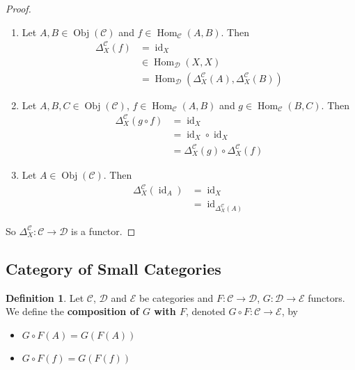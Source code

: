 \documentclass{book}
\theoremstyle{definition}
\newtheorem{defn}[definition]{Definition}
\newcommand{\Del}{\Delta}
\newcommand{\MC}{\mathcal{C}}
\newcommand{\MD}{\mathcal{D}}
\newcommand{\ME}{\mathcal{E}}
\newcommand{\ld}[1]{\label{defn:#1}}
\DeclareMathOperator{\id}{id}
\DeclareMathOperator{\Obj}{Obj}
\DeclareMathOperator{\Hom}{Hom}
\DeclareMathOperator*{\0}{\mbf{0}}
\DeclareMathOperator*{\1}{\mbf{1}}
\begin{document}
	\begin{proof}\
		\begin{enumerate}
			\item Let $A, B \in \Obj(\MC)$ and $f \in \Hom_{\MC}(A, B)$. Then 
			\begin{align*}
				\Del^{\MC}_X (f)
				& = \id_X \\
				& \in \Hom_{\MD}(X, X) \\
				& = \Hom_{\MD}(\Del^{\MC}_X (A), \Del^{\MC}_X (B))
			\end{align*}  
			\item Let $A,B,C \in \Obj(\MC)$, $f \in \Hom_{\MC}(A, B)$ and $g \in \Hom_{\MC}(B, C)$. Then 
			\begin{align*}
				\Del^{\MC}_X (g \circ f) 
				& = \id_X \\
				& = \id_X \circ \id_X \\
				& = \Del^{\MC}_X (g) \circ \Del^{\MC}_X (f)
			\end{align*} 
			\item Let $A \in \Obj(\MC)$. Then 
			\begin{align*}
				\Del^{\MC}_X (\id_A)
				& = \id_X \\
				& = \id_{\Del^{\MC}_X (A)}
			\end{align*}
		\end{enumerate}
		So $\Del^{\MC}_X : \MC \rightarrow \MD$ is a functor.
	\end{proof}


















	\subsection{Category of Small Categories}

	\begin{defn} \ld{13006}
		Let $\MC$, $\MD$ and $\ME$ be categories and $F:\MC \rightarrow \MD$, $G: \MD \rightarrow \ME$ functors. We define the \textbf{composition of $G$ with $F$}, denoted $G \circ F: \MC \rightarrow \ME$, by 
		\begin{itemize}
			\item $G \circ F (A) = G(F(A))$
			\item $G \circ F (f) = G(F(f))$
		\end{itemize} 
	\end{defn}
	
\end{document}
